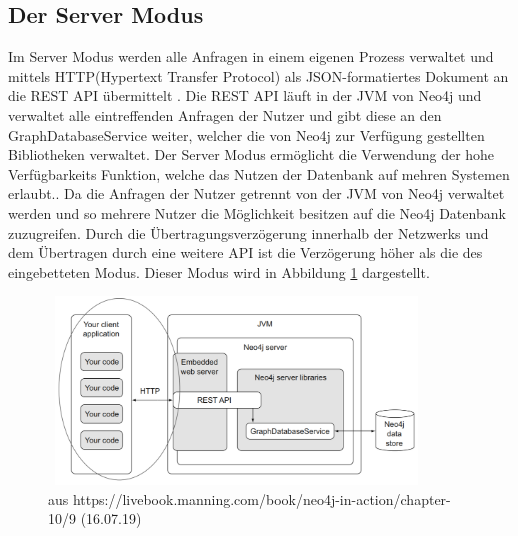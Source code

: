 \subsection{Der Server Modus} \label{Server}
Im Server Modus werden alle Anfragen in einem eigenen Prozess verwaltet und mittels HTTP(Hypertext Transfer Protocol) als JSON-formatiertes Dokument an die REST API übermittelt \parencite{robinson2013graph}. Die REST API läuft in der JVM von Neo4j und verwaltet alle eintreffenden Anfragen der Nutzer und gibt diese an den GraphDatabaseService weiter, welcher die von Neo4j zur Verfügung gestellten Bibliotheken verwaltet. \newline 
Der Server Modus ermöglicht die Verwendung der hohe Verfügbarkeits Funktion, welche das Nutzen der Datenbank auf mehren Systemen erlaubt.\parencite{raj2015neo4j}. Da die Anfragen der Nutzer getrennt von der JVM von Neo4j verwaltet werden und so mehrere Nutzer die Möglichkeit besitzen auf die Neo4j Datenbank zuzugreifen. Durch die  Übertragungsverzögerung innerhalb der Netzwerks und dem Übertragen durch eine weitere API ist die Verzögerung höher als die des eingebetteten Modus. Dieser Modus wird in Abbildung \ref{fig:Server} dargestellt.
\begin{figure}[!htb]
	\centering
	\includegraphics [width=10cm, height=5cm]{Figures/server}
	\caption[Server Modus]{aus https://livebook.manning.com/book/neo4j-in-action/chapter-10/9 (16.07.19)}
	\label{fig:Server}
\end{figure}

